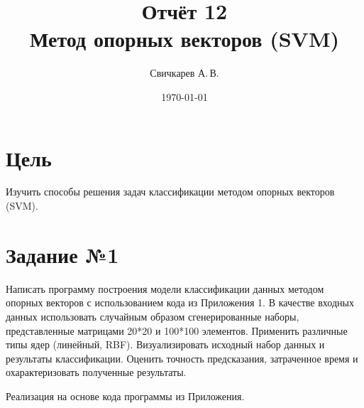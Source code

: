 \documentclass{article} %
\title{Отчёт 12\\
Метод опорных векторов (SVM)} %
\author{Свичкарев А.\,В.} %
\date{\today} %
\begin{document}

\maketitle %

\section{Цель}
Изучить способы решения задач классификации методом опорных
векторов (SVM).

\section{Задание №1}
Написать программу построения модели классификации данных методом опорных
векторов с использованием кода из Приложения 1.
В качестве входных данных использовать случайным образом сгенерированные наборы,
представленные матрицами 20*20 и 100*100 элементов.
Применить различные типы ядер (линейный, RBF).
Визуализировать исходный набор данных и результаты классификации.
Оценить точность предсказания, затраченное время
и охарактеризовать полученные результаты.

Реализация на основе кода программы из Приложения.
\end{document}
